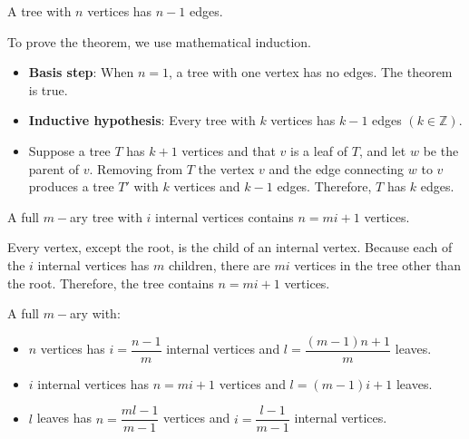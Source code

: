                 \par A tree with $n$ vertices has $n - 1$ edges.
                \par To prove the theorem, we use mathematical induction.
                \begin{itemize}
                    \item \textbf{Basis step}: When $n = 1$, a tree with one vertex has no edges.
                        The theorem is true.
                    \item \textbf{Inductive hypothesis}: Every tree with $k$ vertices has $k - 1$
                        edges $(k \in \mathbb{Z})$.
                    \item Suppose a tree $T$ has $k + 1$ vertices and that $v$ is a leaf of $T$,
                        and let $w$ be the parent of $v$. Removing from $T$ the vertex $v$ and the
                        edge connecting $w$ to $v$ produces a tree $T'$ with $k$ vertices and
                        $k - 1$ edges. Therefore, $T$ has $k$ edges.
                \end{itemize}
        \hiiiEND
                \par A full $m-$ary tree with $i$ internal vertices contains $n = mi + 1$
                vertices.
                \par Every vertex, except the root, is the child of an internal vertex. Because
                each of the $i$ internal vertices has $m$ children, there are $mi$ vertices
                in the tree other than the root. Therefore, the tree contains $n = mi + 1$ vertices.
                \par A full $m-$ary with:
                \begin{itemize}
                    \item $n$ vertices has $i = \dfrac{n - 1}{m}$ internal vertices and
                        $l = \dfrac{(m - 1)n + 1}{m}$ leaves.
                    \item $i$ internal vertices has $n = mi + 1$ vertices and $l = (m - 1)i + 1$
                        leaves.
                    \item $l$ leaves has $n = \dfrac{ml - 1}{m - 1}$ vertices and
                        $i = \dfrac{l - 1}{m - 1}$ internal vertices.
                \end{itemize}
